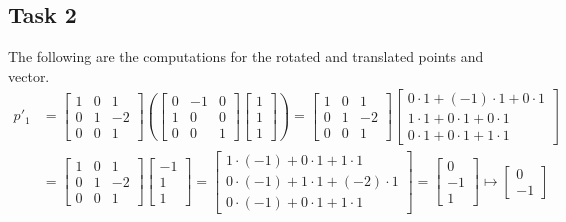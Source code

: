 \documentclass{article}
\begin{document}
\subsection{Task 2}
The following are the computations for the rotated and translated points and vector.
\begin{align*}
	p'_1 & =  \begin{bmatrix}1&0&1\\ 0&1&-2\\0&0&1\end{bmatrix} \left( \begin{bmatrix}0&-1&0\\ 1&0&0\\ 0&0&1\end{bmatrix}\begin{bmatrix}1\\ 1\\ 1\end{bmatrix} \right)  =  \begin{bmatrix}1&0&1\\ 0&1&-2\\0&0&1\end{bmatrix}\begin{bmatrix}0\cdot 1+\left(-1\right)\cdot 1+0\cdot 1\\ 1\cdot 1+0\cdot 1+0\cdot 1\\ 0\cdot 1+0\cdot 1+1\cdot 1\end{bmatrix} \\
	& = \begin{bmatrix}1&0&1\\ 0&1&-2\\0&0&1\end{bmatrix}\begin{bmatrix}-1\\ 1\\ 1\end{bmatrix} = \begin{bmatrix}1\cdot \left(-1\right)+0\cdot 1+1\cdot 1\\ 0\cdot \left(-1\right)+1\cdot 1+\left(-2\right)\cdot 1\\ 0\cdot \left(-1\right)+0\cdot 1+1\cdot 1\end{bmatrix} = \begin{bmatrix}0\\ -1\\ 1\end{bmatrix} \mapsto \begin{bmatrix}0\\ -1\end{bmatrix}
\end{align*}
\end{document}
